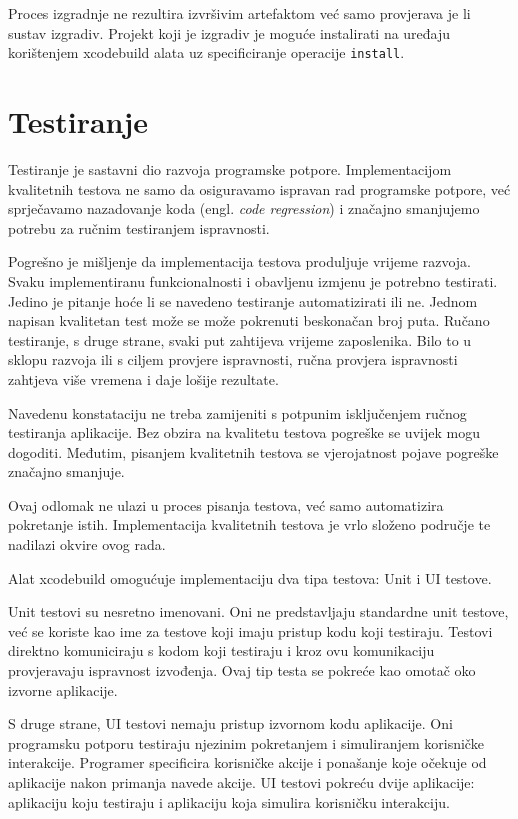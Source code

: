 \documentclass[times, utf8, diplomski, numeric]{fer}
\newcommand{\eng}[1]{(engl. \textit{#1})}
\begin{document}
Proces izgradnje ne rezultira izvršivim artefaktom već samo provjerava je li sustav izgradiv. Projekt koji je izgradiv je moguće instalirati na uređaju korištenjem xcodebuild alata uz specificiranje operacije \verb|install|.

\section{Testiranje}

Testiranje je sastavni dio razvoja programske potpore. Implementacijom kvalitetnih testova ne samo da osiguravamo ispravan rad programske potpore, već sprječavamo nazadovanje koda \eng{code regression} i značajno smanjujemo potrebu za ručnim testiranjem ispravnosti\citep{wiki:SoftwareTesting}.

Pogrešno je mišljenje da implementacija testova produljuje vrijeme razvoja. Svaku implementiranu funkcionalnosti i obavljenu izmjenu je potrebno testirati. Jedino je pitanje hoće li se navedeno testiranje automatizirati ili ne. Jednom napisan kvalitetan test može se može pokrenuti beskonačan broj puta. Ručano testiranje, s druge strane, svaki put zahtijeva vrijeme zaposlenika. Bilo to u sklopu razvoja ili s ciljem provjere ispravnosti, ručna provjera ispravnosti zahtjeva više vremena i daje lošije rezultate.

Navedenu konstataciju ne treba zamijeniti s potpunim isključenjem ručnog testiranja aplikacije. Bez obzira na kvalitetu testova pogreške se uvijek mogu dogoditi. Međutim, pisanjem kvalitetnih testova se vjerojatnost pojave pogreške značajno smanjuje.

Ovaj odlomak ne ulazi u proces pisanja testova, već samo automatizira pokretanje istih. Implementacija kvalitetnih testova je vrlo složeno područje te nadilazi okvire ovog rada.

Alat xcodebuild omogućuje implementaciju dva tipa testova: Unit i UI testove.

Unit testovi su nesretno imenovani. Oni ne predstavljaju standardne unit testove, već se koriste kao ime za testove koji imaju pristup kodu koji testiraju. Testovi direktno komuniciraju s kodom koji testiraju i kroz ovu komunikaciju provjeravaju ispravnost izvođenja. Ovaj tip testa se pokreće kao omotač oko izvorne aplikacije.

S druge strane, UI testovi nemaju pristup izvornom kodu aplikacije. Oni programsku potporu testiraju njezinim pokretanjem i simuliranjem korisničke interakcije. Programer specificira korisničke akcije i ponašanje koje očekuje od aplikacije nakon primanja navede akcije. UI testovi pokreću dvije aplikacije: aplikaciju koju testiraju i aplikaciju koja simulira korisničku interakciju.
\end{document}
